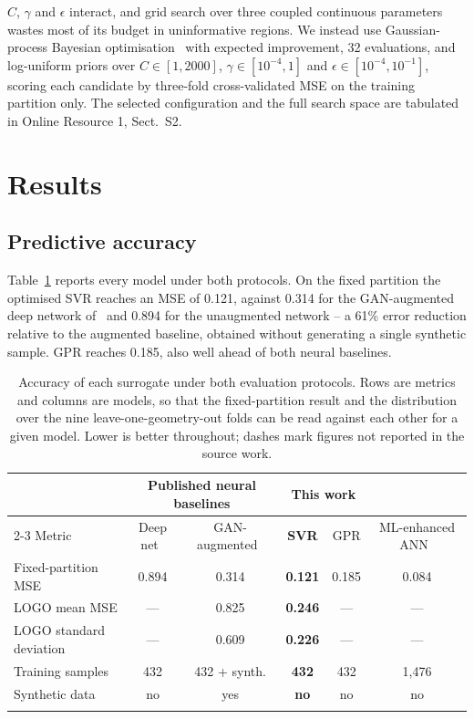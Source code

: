 \documentclass[iicol,pdflatex,sn-basic,Numbered]{sn-jnl}
\begin{document}
$C$, $\gamma$ and $\epsilon$ interact, and grid search over three coupled
continuous parameters wastes most of its budget in uninformative regions. We
instead use Gaussian-process Bayesian optimisation~\cite{snoek2012} with expected
improvement, 32 evaluations, and log-uniform priors over
$C\in[1,2000]$, $\gamma\in[10^{-4},1]$ and $\epsilon\in[10^{-4},10^{-1}]$,
scoring each candidate by three-fold cross-validated MSE on the training
partition only. The selected configuration and the full search space are
tabulated in Online Resource 1, Sect.~S2.

\section{Results}\label{sec:results}

\subsection{Predictive accuracy}\label{sec:accuracy}

Table~\ref{tab:benchmark} reports every model under both protocols. On the fixed
partition the optimised SVR reaches an MSE of 0.121, against 0.314 for the
GAN-augmented deep network of~\cite{zelaci2021} and 0.894 for the unaugmented
network -- a 61\% error reduction relative to the augmented baseline, obtained
without generating a single synthetic sample. GPR reaches 0.185, also well ahead
of both neural baselines.

\begin{table}[t]
\caption{Accuracy of each surrogate under both evaluation protocols. Rows are
metrics and columns are models, so that the fixed-partition result and the
distribution over the nine leave-one-geometry-out folds can be read against each
other for a given model. Lower is better throughout; dashes mark figures not
reported in the source work.}\label{tab:benchmark}
\small
\begin{tabular*}{\textwidth}{@{\extracolsep\fill}lccccc}
\toprule
& \multicolumn{2}{c}{Published neural baselines} & \multicolumn{2}{c}{This work} & \\
\cmidrule{2-3}\cmidrule{4-5}
Metric & Deep net~\cite{zelaci2021} & GAN-augmented~\cite{zelaci2021}
& \textbf{SVR} & GPR & ML-enhanced ANN~\cite{ehyaee2024} \\
\midrule
Fixed-partition MSE       & 0.894 & 0.314 & \textbf{0.121} & 0.185 & 0.084 \\
LOGO mean MSE             & ---   & 0.825 & \textbf{0.246} & ---   & ---   \\
LOGO standard deviation   & ---   & 0.609 & \textbf{0.226} & ---   & ---   \\
Training samples          & 432   & 432 + synth. & \textbf{432} & 432 & 1{,}476 \\
Synthetic data            & no    & yes   & \textbf{no}    & no    & no    \\
\botrule
\end{tabular*}
\end{table}
\end{document}
